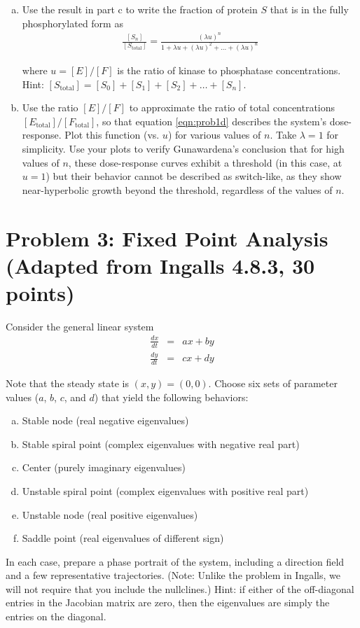 \documentclass{article}
\begin{document}
\begin{enumerate}[a)]
\item Use the result in part c to write the fraction of protein $S$ that is in the fully phosphorylated form as
\begin{eqnarray}
\frac{\left[ S_n \right]}{\left[ S_{\textrm{total}} \right]} = \frac{\left( \lambda u \right)^n}{1 + \lambda u + \left( \lambda u \right)^2 + \ldots + \left( \lambda u \right)^n} \label{eqn:prob1d}
\end{eqnarray}

where $u=[E]/[F]$ is the ratio of kinase to phosphatase concentrations. Hint: $[S_{\textrm{total}}] = [S_0] + [S_1] + [S_2] + \ldots + [S_n]$.

\item Use the ratio $[E]/[F]$ to approximate the ratio of total concentrations $[E_{\textrm{total}}]/[F_{\textrm{total}}]$, so that equation \ref{eqn:prob1d} describes the system's dose-response. Plot this function (vs. $u$) for various values of $n$. Take $\lambda = 1$ for simplicity. Use your plots to verify Gunawardena's conclusion that for high values of $n$, these dose-response curves exhibit a threshold (in this case, at $u=1$) but their behavior cannot be described as switch-like, as they show near-hyperbolic growth beyond the threshold, regardless of the values of $n$.
\end{enumerate}

\section*{Problem 3: Fixed Point Analysis (Adapted from Ingalls 4.8.3, 30 points)}

Consider the general linear system
\begin{eqnarray*}
\frac{dx}{dt} & = & ax + by\\
\frac{dy}{dt} & = & cx + dy
\end{eqnarray*}

Note that the steady state is $(x,y)=(0,0)$. Choose six sets of parameter values ($a$, $b$, $c$, and $d$) that yield the following behaviors:

\begin{enumerate}[a)]
\setlength{\itemsep}{0pt}
\item Stable node (real negative eigenvalues)
\item Stable spiral point (complex eigenvalues with negative real part)
\item Center (purely imaginary eigenvalues)
\item Unstable spiral point (complex eigenvalues with positive real part)
\item Unstable node (real positive eigenvalues)
\item Saddle point (real eigenvalues of different sign)
\end{enumerate}

In each case, prepare a phase portrait of the system, including a direction field and a few representative trajectories. (Note: Unlike the problem in Ingalls, we will not require that you include the nullclines.) Hint: if either of the off-diagonal entries in the Jacobian matrix are zero, then the eigenvalues are simply the entries on the diagonal.
\end{document}
